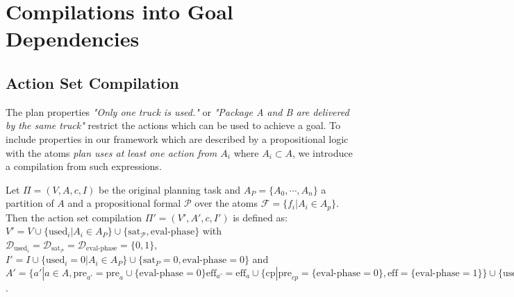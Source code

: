\section{Compilations into Goal Dependencies}



\subsection{Action Set Compilation}


The plan properties \textit{"Only one truck is used."} or \textit{"Package A and 
B are delivered by the same truck"} restrict the actions which can be used to 
achieve a goal. To include properties in our framework which are described by a
propositional logic with the atoms \emph{plan uses at least one action from $A_i$} 
where $A_i \subset A$, we introduce a compilation from such expressions.

\begin{definition}
	Let $\Pi = (V, A, c, I)$ be the original planning task and $A_P=\{A_0, \cdots, A_n\}$ 
	a partition of $A$ and a propositional formal $\mathcal{P}$ over the atoms $\mathcal{F} = \{f_i | A_i \in A_p\}$. 
	Then the action set compilation $\Pi' = (V', A', c, I')$ is defined as: 
	$V' = V \cup \{\text{used}_i | A_i \in A_P\} \cup \{\text{sat}_{\mathcal{P}}, \text{eval-phase}\}$ 
	with $\mathcal{D}_{\text{used}_i} = \mathcal{D}_{\text{sat}_{\mathcal{P}}} = \mathcal{D}_{\text{eval-phase}} = \{0,1\}$, 
	$I' = I \cup \{\text{used}_i = 0 | A_i \in A_P\} \cup \{\text{sat}_{P} = 0, \text{eval-phase} = 0\}$ 
	and $A' = \{ a' | a \in A, 
	\text{pre}_{a'} = \text{pre}_{a} \cup \{\text{eval-phase} = 0\} \text{eff}_{a'} = \text{eff}_a \cup 
	\{\text{cp} | \text{pre}_{cp} = \{\text{eval-phase} = 0\}, \text{eff} = \{\text{eval-phase} = 1 \}\} \cup 	
	\{\text{used}_i = 1 | a \in A_i \in A_P\} \cup  
	\{\text{actions to eval } \mathcal{P}\}$. 
\end{definition}

